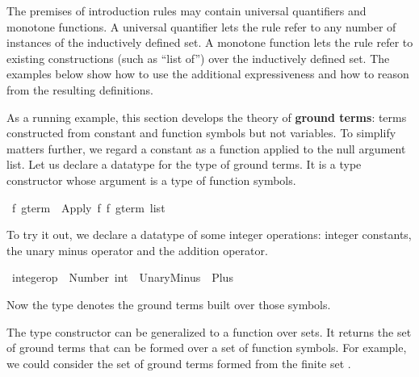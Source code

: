 %
\begin{isabellebody}%
\def\isabellecontext{Advanced}%
%
\isadelimtheory
%
\endisadelimtheory
%
\isatagtheory
%
\endisatagtheory
{\isafoldtheory}%
%
\isadelimtheory
%
\endisadelimtheory
%
\begin{isamarkuptext}%
The premises of introduction rules may contain universal quantifiers and
monotone functions.  A universal quantifier lets the rule 
refer to any number of instances of 
the inductively defined set.  A monotone function lets the rule refer
to existing constructions (such as ``list of'') over the inductively defined
set.  The examples below show how to use the additional expressiveness
and how to reason from the resulting definitions.%
\end{isamarkuptext}%
\isamarkuptrue%
%
\isamarkuptrue%
%
\begin{isamarkuptext}%
%
%
As a running example, this section develops the theory of \textbf{ground
terms}: terms constructed from constant and function 
symbols but not variables. To simplify matters further, we regard a
constant as a function applied to the null argument  list.  Let us declare a
datatype  for the type of ground  terms. It is a type constructor
whose argument is a type of  function symbols.%
\end{isamarkuptext}%
\isamarkuptrue%
\isamarkupfalse%
\ {}f\ gterm\ {}\ Apply\ {}f\ {}{}f\ gterm\ list{}%
\begin{isamarkuptext}%
To try it out, we declare a datatype of some integer operations: 
integer constants, the unary minus operator and the addition 
operator.%
\end{isamarkuptext}%
\isamarkuptrue%
\isamarkupfalse%
\ integer{}op\ {}\ Number\ int\ {}\ UnaryMinus\ {}\ Plus%
\begin{isamarkuptext}%
Now the type  denotes the ground 
terms built over those symbols.

The type constructor  can be generalized to a function 
over sets.  It returns 
the set of ground terms that can be formed over a set  of function symbols. For
example,  we could consider the set of ground terms formed from the finite 
set .


\end{isamarkuptext}
\end{isabellebody}
